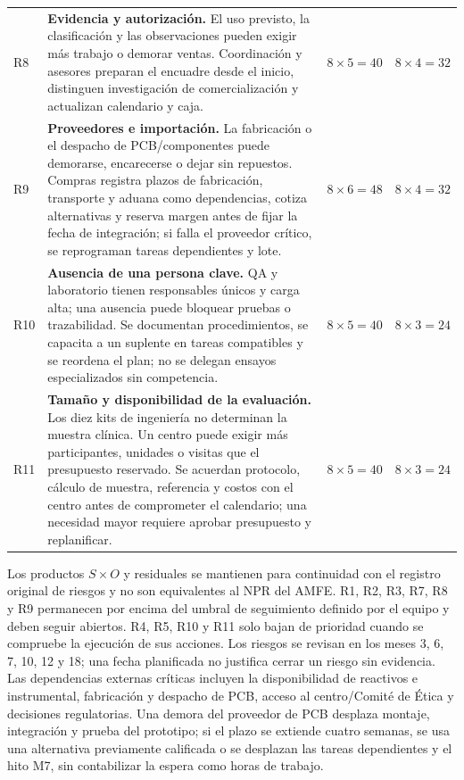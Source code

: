 {\begin{xltabular}{\linewidth}{l X l l}
R8 & \textbf{Evidencia y autorización.} El uso previsto, la clasificación y las observaciones pueden exigir más trabajo o demorar ventas. Coordinación y asesores preparan el encuadre desde el inicio, distinguen investigación de comercialización y actualizan calendario y caja. & $8\times5=40$ & $8\times4=32$\\
R9 & \textbf{Proveedores e importación.} La fabricación o el despacho de PCB/componentes puede demorarse, encarecerse o dejar sin repuestos. Compras registra plazos de fabricación, transporte y aduana como dependencias, cotiza alternativas y reserva margen antes de fijar la fecha de integración; si falla el proveedor crítico, se reprograman tareas dependientes y lote. & $8\times6=48$ & $8\times4=32$\\
R10 & \textbf{Ausencia de una persona clave.} QA y laboratorio tienen responsables únicos y carga alta; una ausencia puede bloquear pruebas o trazabilidad. Se documentan procedimientos, se capacita a un suplente en tareas compatibles y se reordena el plan; no se delegan ensayos especializados sin competencia. & $8\times5=40$ & $8\times3=24$\\
R11 & \textbf{Tamaño y disponibilidad de la evaluación.} Los diez kits de ingeniería no determinan la muestra clínica. Un centro puede exigir más participantes, unidades o visitas que el presupuesto reservado. Se acuerdan protocolo, cálculo de muestra, referencia y costos con el centro antes de comprometer el calendario; una necesidad mayor requiere aprobar presupuesto y replanificar. & $8\times5=40$ & $8\times3=24$\\
\bottomrule\end{xltabular}}

Los productos $S\times O$ y residuales se mantienen para continuidad con el registro original de riesgos y no son equivalentes al NPR del AMFE. R1, R2, R3, R7, R8 y R9 permanecen por encima del umbral de seguimiento definido por el equipo y deben seguir abiertos. R4, R5, R10 y R11 solo bajan de prioridad cuando se compruebe la ejecución de sus acciones. Los riesgos se revisan en los meses 3, 6, 7, 10, 12 y 18; una fecha planificada no justifica cerrar un riesgo sin evidencia. Las dependencias externas críticas incluyen la disponibilidad de reactivos e instrumental, fabricación y despacho de PCB, acceso al centro/Comité de Ética y decisiones regulatorias. Una demora del proveedor de PCB desplaza montaje, integración y prueba del prototipo; si el plazo se extiende cuatro semanas, se usa una alternativa previamente calificada o se desplazan las tareas dependientes y el hito M7, sin contabilizar la espera como horas de trabajo.

